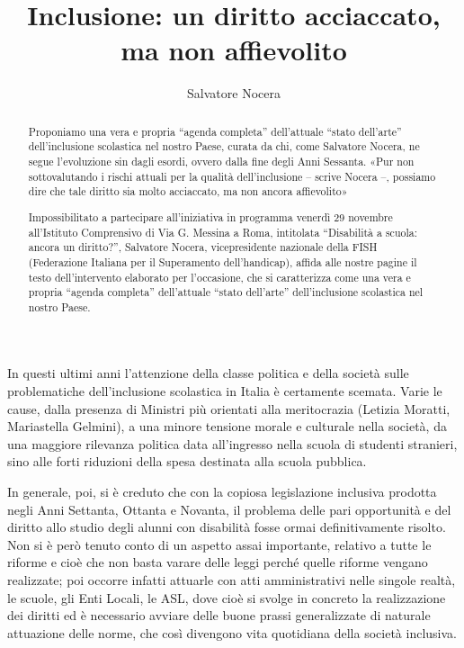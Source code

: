 \author{Salvatore Nocera}
\title{Inclusione: un diritto acciaccato, ma non affievolito}
\label{cha:Nocera281112}
\begin{abstract}
Proponiamo una vera e propria “agenda completa” dell'attuale “stato dell'arte” dell'inclusione scolastica nel nostro Paese, curata da chi, come Salvatore Nocera, ne segue l'evoluzione sin dagli esordi, ovvero dalla fine degli Anni Sessanta. «Pur non sottovalutando i rischi attuali per la qualità dell'inclusione -- scrive Nocera --, possiamo dire che tale diritto sia molto acciaccato, ma non ancora affievolito»

Impossibilitato a partecipare all'iniziativa in programma venerdì 29 novembre all'Istituto Comprensivo di Via G. Messina a Roma, intitolata “Disabilità a scuola: ancora un diritto?”, Salvatore Nocera, vicepresidente nazionale della FISH (Federazione Italiana per il Superamento dell'handicap), affida alle nostre pagine il testo dell'intervento elaborato per l'occasione, che si caratterizza come una vera e propria “agenda completa” dell'attuale “stato dell'arte” dell'inclusione scolastica nel nostro Paese.
\end{abstract}
\maketitle
{}

In questi ultimi anni l'attenzione della classe politica e della società sulle problematiche dell'inclusione scolastica in Italia è certamente scemata. Varie le cause, dalla presenza di Ministri più orientati alla meritocrazia (Letizia Moratti, Mariastella Gelmini), a una minore tensione morale e culturale nella società, da una maggiore rilevanza politica data all'ingresso nella scuola di studenti stranieri, sino alle forti riduzioni della spesa destinata alla scuola pubblica.

In generale, poi, si è creduto che con la copiosa legislazione inclusiva prodotta negli Anni Settanta, Ottanta e Novanta, il problema delle pari opportunità e del diritto allo studio degli alunni con disabilità fosse ormai definitivamente risolto. Non si è però tenuto conto di un aspetto assai importante, relativo a tutte le riforme e cioè che non basta varare delle leggi perché quelle riforme vengano realizzate; poi occorre infatti attuarle con atti amministrativi nelle singole realtà, le scuole, gli Enti Locali, le ASL, dove cioè si svolge in concreto la realizzazione dei diritti ed è necessario avviare delle buone prassi generalizzate di naturale attuazione delle norme, che così divengono vita quotidiana della società inclusiva.


